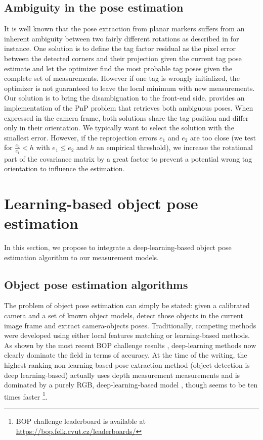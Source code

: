 \subsection{Ambiguity in the pose estimation}
It is well known that the pose extraction from planar markers suffers from an inherent ambiguity between two fairly different rotations as described in 
\cite{8206468} for instance. One solution is to define the tag factor residual as the pixel error between the detected corners and their projection given the
current tag pose estimate and let the optimizer find the most probable tag poses given the complete set of measurements. However if one tag is wrongly initialized, 
the optimizer is not guaranteed to leave the local minimum with new measurements. Our solution is to bring the disambiguation to the front-end side.
\cite{collins2014infinitesimal} provides an implementation of the PnP problem that retrieves both ambiguous poses. When expressed in the camera frame, 
both solutions share the tag position and differ only in their orientation. We typically want to select the solution with the smallest error. 
However, if the reprojection errors $e_1$ and $e_2$ are too close (we test for $\tfrac{e_2}{e_1} < h$ with $e_1 \leq e_2$ and $h$ an empirical threshold), 
we increase the rotational part of the covariance matrix by a great factor to prevent a potential wrong tag orientation to influence the estimation.











%
%
%
%
\section{Learning-based object pose estimation}
In this section, we propose to integrate a deep-learning-based object pose estimation algorithm \cite{labbe2020cosypose} to our measurement models. 


\subsection{Object pose estimation algorithms}
\label{sec:object_pose_est}
The problem of object pose estimation can simply be stated: given a calibrated camera and a set of known object models, detect those objects in the current image 
frame and extract camera-objects poses. Traditionally, competing methods were developed using either local features matching or learning-based methods.
As shown by the most recent BOP challenge results \cite{hodan2020bop}, deep-learning methods now clearly dominate the field in terms of accuracy. 
At the time of the writing, the highest-ranking non-learning-based pose extraction method \cite{konig2020hybrid} (object detection is deep learning-based) 
actually uses depth measurement measurements and is dominated by a purely RGB, deep-learning-based model \cite{haugaard2021surfemb}, though \cite{konig2020hybrid} 
seems to be ten times faster \footnote{BOP challenge leaderboard is available at \url{https://bop.felk.cvut.cz/leaderboards/}}.

